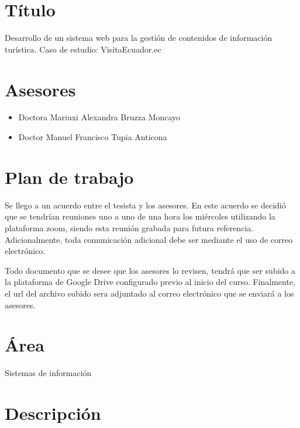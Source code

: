 \documentclass{article}
\begin{document}


\section{Título}
Desarrollo de un sistema web para la gestión de contenidos de información turística.
Caso de estudio: VisitaEcuador.ec

\section{Asesores}
\begin{itemize}
    \item{Doctora Mariuxi Alexandra Bruzza Moncayo}
    \item{Doctor Manuel Francisco Tupia Anticona}
\end{itemize}

\section{Plan de trabajo}

Se llego a un acuerdo entre el tesista y los asesores. En este acuerdo se decidió
que se tendrían reuniones uno a uno de una hora los miércoles utilizando la
plataforma zoom, siendo esta reunión grabada para futura referencia.
Adicionalmente, toda comunicación adicional debe ser mediante el uso de correo electrónico.

Todo documento que se desee que los asesores lo revisen, tendrá que ser subido
a la plataforma de Google Drive configurado previo al inicio del curso. Finalmente,
el url del archivo subido sera adjuntado al correo electrónico que se enviará a
los asesores.



\newpage

\section{Área}
Sistemas de información

\section{Descripción}
\end{document}
